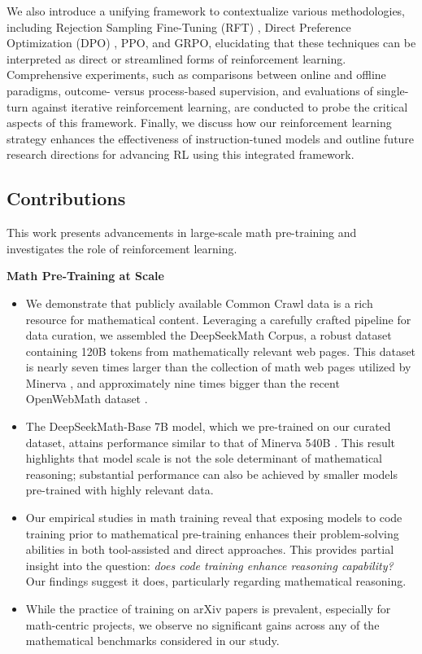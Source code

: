 We also introduce a unifying framework to contextualize various methodologies, including Rejection Sampling Fine-Tuning (RFT) \citep{yuan2023scaling}, Direct Preference Optimization (DPO) \citep{dpo}, PPO, and GRPO, elucidating that these techniques can be interpreted as direct or streamlined forms of reinforcement learning. Comprehensive experiments, such as comparisons between online and offline paradigms, outcome- versus process-based supervision, and evaluations of single-turn against iterative reinforcement learning, are conducted to probe the critical aspects of this framework. Finally, we discuss how our reinforcement learning strategy enhances the effectiveness of instruction-tuned models and outline future research directions for advancing RL using this integrated framework.

\subsection{Contributions}
This work presents advancements in large-scale math pre-training and investigates the role of reinforcement learning.

\textbf{Math Pre-Training at Scale}

\begin{itemize}[topsep=0pt]
    \item We demonstrate that publicly available Common Crawl data is a rich resource for mathematical content. Leveraging a carefully crafted pipeline for data curation, we assembled the DeepSeekMath Corpus, a robust dataset containing 120B tokens from mathematically relevant web pages. This dataset is nearly seven times larger than the collection of math web pages utilized by Minerva \citep{minerva}, and approximately nine times bigger than the recent OpenWebMath dataset \citep{openwebmath}.

    \item The DeepSeekMath-Base 7B model, which we pre-trained on our curated dataset, attains performance similar to that of Minerva 540B \citep{minerva}. This result highlights that model scale is not the sole determinant of mathematical reasoning; substantial performance can also be achieved by smaller models pre-trained with highly relevant data.

    \item Our empirical studies in math training reveal that exposing models to code training prior to mathematical pre-training enhances their problem-solving abilities in both tool-assisted and direct approaches. This provides partial insight into the question: \textit{does code training enhance reasoning capability?} Our findings suggest it does, particularly regarding mathematical reasoning.

    \item While the practice of training on arXiv papers is prevalent, especially for math-centric projects, we observe no significant gains across any of the mathematical benchmarks considered in our study.
\end{itemize}

